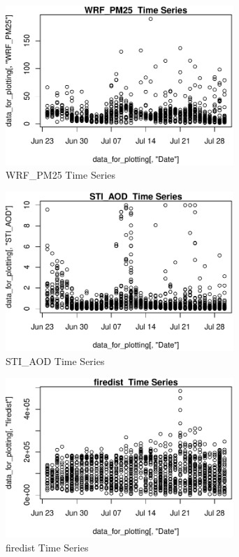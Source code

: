\begin{figure} 
\centering  
\includegraphics[width=0.77\textwidth]{Code_Outputs/ML_input_report_AllforCaret_cleaned_StepPractice_part_practice_WRF_PM25TS.pdf} 
\caption{\label{fig:ML_input_report_AllforCaret_cleaned_StepPractice_part_practiceWRF_PM25TS}WRF_PM25  Time Series} 
\end{figure} 
 

\begin{figure} 
\centering  
\includegraphics[width=0.77\textwidth]{Code_Outputs/ML_input_report_AllforCaret_cleaned_StepPractice_part_practice_STI_AODTS.pdf} 
\caption{\label{fig:ML_input_report_AllforCaret_cleaned_StepPractice_part_practiceSTI_AODTS}STI_AOD  Time Series} 
\end{figure} 
 

\begin{figure} 
\centering  
\includegraphics[width=0.77\textwidth]{Code_Outputs/ML_input_report_AllforCaret_cleaned_StepPractice_part_practice_firedistTS.pdf} 
\caption{\label{fig:ML_input_report_AllforCaret_cleaned_StepPractice_part_practicefiredistTS}firedist  Time Series} 
\end{figure} 
 

